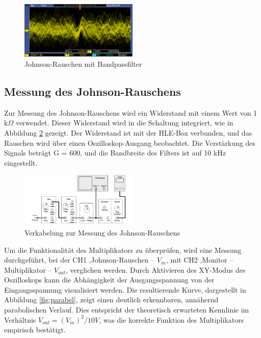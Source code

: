 \begin{figure}[htbp]
    \centering
    \includegraphics[width=0.5\textwidth]{figs/johnson noise with bandfilter.PNG}
    \caption{Johnson-Rauschen mit Bandpassfilter}
    \label{fig:bandfilter}
\end{figure}
\FloatBarrier

\subsection{Messung des Johnson-Rauschens}
Zur Messung des Johnson-Rauschens wird ein Widerstand mit einem Wert von 1 k$\Omega$ verwendet. Dieser Widerstand wird in die Schaltung integriert, wie in Abbildung \ref{fig:johnson messung} gezeigt. Der Widerstand ist mit der HLE-Box verbunden, und das Rauschen wird über einen Oszilloskop-Ausgang beobachtet. Die Verstärkung des Signals beträgt G = 600, und die Bandbreite des Filters ist auf 10 kHz eingestellt.
\FloatBarrier
\begin{figure}[htbp]
    \centering
    \includegraphics[width=0.5\textwidth]{figs/johnson hle and dmm.png}
    \caption{Verkabelung zur Messung des Johnson-Rauschens \cite{praktikum}}
    \label{fig:johnson messung}
\end{figure}
\FloatBarrier

Um die Funktionalität des Multiplikators zu überprüfen, wird eine Messung durchgeführt, bei der CH1 ,Johnson-Rauschen – $V_{in}$, mit CH2 ,Monitor – Multiplikator – $V_{out}$, verglichen werden. Durch Aktivieren des XY-Modus des Oszilloskops kann die Abhängigkeit der Ausgangsspannung von der Eingangsspannung visualisiert werden. Die resultierende Kurve, dargestellt in Abbildung \ref{fig:parabel}, zeigt einen deutlich erkennbaren, annähernd parabolischen Verlauf. Dies entspricht der theoretisch erwarteten Kennlinie im Verhältnis $V_{out} = (V_{in})^2 / 10 V$, was die korrekte Funktion des Multiplikators empirisch bestätigt. 

